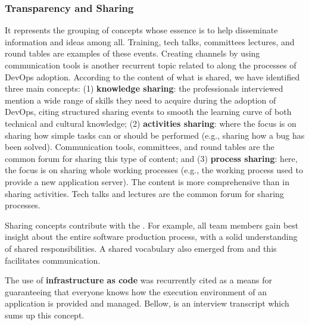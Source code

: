 \subsubsection{Transparency and Sharing} It represents the grouping of concepts
whose essence is to help disseminate information and ideas among all. Training,
tech talks, committees lectures, and round tables
are examples of these events. Creating
channels by using communication tools is another recurrent topic
related to  along the processes of DevOps adoption.
According to the content of what is shared, we have identified three main concepts:
(1) {\bf knowledge sharing}: the professionals interviewed mention a wide range of
skills they need to acquire during the adoption of DevOps, citing
structured sharing events to smooth the learning curve of both technical and
cultural knowledge; (2) {\bf activities sharing}: where the focus is on sharing how simple tasks can or
should be performed (e.g., sharing how a bug has been solved). Communication tools,
committees, and round tables are the common forum for sharing this type of content;
and (3) {\bf process sharing}: here, the focus is on sharing whole working processes
(e.g., the working process used to provide a new application server). The
content is more comprehensive than in sharing activities. Tech talks and
lectures are the common forum for sharing processes.

Sharing concepts contribute with the \cc. For example,
all team members gain best insight about the entire software production
process, with a solid understanding of shared responsibilities. A shared vocabulary also
emerged from  and this facilitates communication.

The use of \textbf{infrastructure as code} was
recurrently cited as a means for guaranteeing that everyone knows how the execution environment of
an application is provided and managed. Bellow, is an interview
transcript which sums up this concept.


